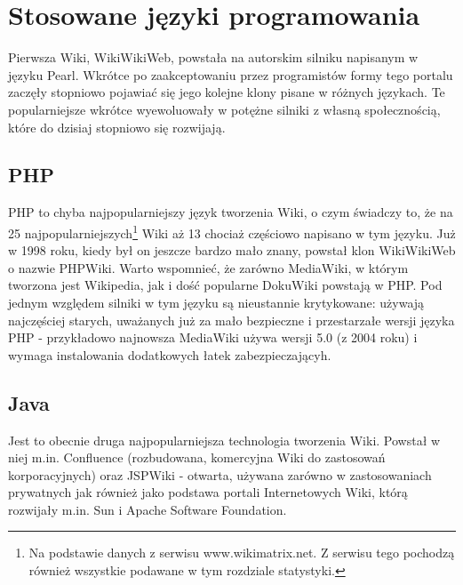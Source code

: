\documentclass{article}
\begin{document}
			
	

\newpage
\section{Stosowane języki programowania}
Pierwsza Wiki, WikiWikiWeb, powstała na autorskim silniku napisanym w języku Pearl. Wkrótce po zaakceptowaniu przez programistów formy tego portalu zaczęły stopniowo pojawiać się jego kolejne klony pisane w różnych językach. Te popularniejsze wkrótce wyewoluowały w potężne silniki z własną społecznością, które do dzisiaj stopniowo się rozwijają. 
	\subsection{PHP} 
	PHP to chyba najpopularniejszy język tworzenia Wiki, o czym świadczy to, że na 25 najpopularniejszych\footnote{Na podstawie danych z serwisu www.wikimatrix.net. Z serwisu tego pochodzą również wszystkie podawane w tym rozdziale statystyki.} Wiki aż 13 chociaż częściowo napisano w tym języku. Już w 1998 roku, kiedy był on jeszcze bardzo mało znany, powstał klon WikiWikiWeb o nazwie PHPWiki. Warto wspomnieć, że zarówno MediaWiki, w którym tworzona jest Wikipedia, jak i dość popularne DokuWiki powstają w PHP. Pod jednym względem silniki w tym języku są nieustannie krytykowane: używają najczęściej starych, uważanych już za mało bezpieczne i przestarzałe wersji języka PHP - przykładowo najnowsza MediaWiki używa wersji 5.0 (z 2004 roku) i wymaga instalowania dodatkowych łatek zabezpieczającyh.  
	\subsection{Java}
	Jest to obecnie druga najpopularniejsza technologia tworzenia Wiki. Powstał w niej m.in. Confluence (rozbudowana, komercyjna Wiki do zastosowań korporacyjnych) oraz JSPWiki - otwarta, używana zarówno w zastosowaniach prywatnych jak również jako podstawa portali Internetowych Wiki, którą rozwijały m.in. Sun i Apache Software Foundation.
\end{document}
